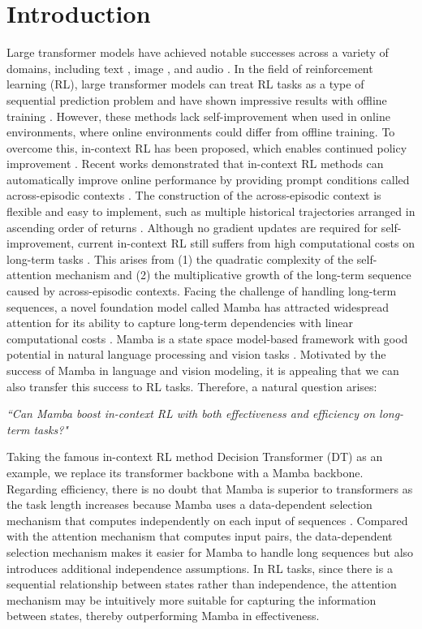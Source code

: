 \documentclass{article}
\begin{document}
\section{Introduction}
Large transformer models \cite{4} have achieved notable successes across a variety of domains, including text \cite{47}, image \cite{48}, and audio \cite{49}.
In the field of reinforcement learning (RL), large transformer models can treat RL tasks as a type of sequential prediction problem and have shown impressive results with offline training \cite{14,27}. However, these methods lack self-improvement when used in online environments, where online environments could differ from offline training. To overcome this, in-context RL has been proposed, which enables continued policy improvement \cite{8}.
Recent works demonstrated that in-context RL methods can automatically improve online performance by providing prompt conditions called across-episodic contexts \cite{3}. The construction of the across-episodic context is flexible and easy to implement, such as multiple historical trajectories arranged in ascending order of returns \cite{1}. Although no gradient updates are required for self-improvement, current in-context RL still suffers from high computational costs on long-term tasks \cite{8}. This arises from (1) the quadratic complexity of the self-attention mechanism and (2) the multiplicative growth of the long-term sequence caused by across-episodic contexts.
Facing the challenge of handling long-term sequences, a novel foundation model called Mamba has attracted widespread attention for its ability to capture long-term dependencies with linear computational costs \cite{10}. Mamba is a state space model-based framework with good potential in natural language processing and vision tasks \cite{11}. Motivated by the success of Mamba in language and vision modeling, it is appealing that we can also transfer this success to RL tasks. Therefore, a natural question arises:
\vspace{-5pt}
\begin{center}
\emph{``Can Mamba boost in-context RL with both effectiveness and efficiency on long-term tasks?"}
\end{center}
\vspace{-5pt}
Taking the famous in-context RL method Decision Transformer (DT) \cite{8} as an example, we replace its transformer backbone with a Mamba backbone. Regarding efficiency, there is no doubt that Mamba is superior to transformers as the task length increases because Mamba uses a data-dependent selection mechanism that computes independently on each input of sequences \cite{10}. Compared with the attention mechanism that computes input pairs, the data-dependent selection mechanism makes it easier for Mamba to handle long sequences but also introduces additional independence assumptions. In RL tasks, since there is a sequential relationship between states rather than independence, the attention mechanism may be intuitively more suitable for capturing the information between states, thereby outperforming Mamba in effectiveness.
\end{document}
